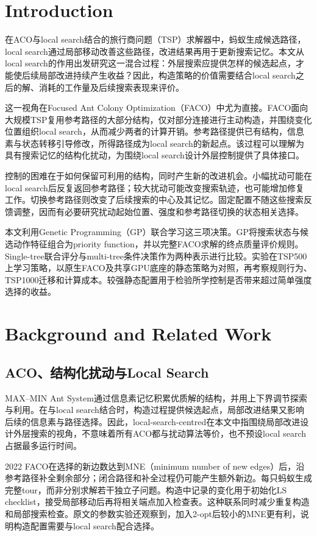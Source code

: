 \section{Introduction}
在ACO与local search结合的旅行商问题（TSP）求解器中，蚂蚁生成候选路径，local search通过局部移动改善这些路径，改进结果再用于更新搜索记忆\cite{stuetzle2000,skinderowicz2022}。本文从local search的作用出发研究这一混合过程：外层搜索应提供怎样的候选起点，才能使后续局部改进持续产生收益？因此，构造策略的价值需要结合local search之后的解、消耗的工作量及后续搜索表现来评价。

这一视角在Focused Ant Colony Optimization（FACO）中尤为直接。FACO面向大规模TSP复用参考路径的大部分结构，仅对部分连接进行主动构造，并围绕变化位置组织local search，从而减少两者的计算开销\cite{skinderowicz2022}。参考路径提供已有结构，信息素与状态转移引导修改，所得路径成为local search的新起点。该过程可以理解为具有搜索记忆的结构化扰动，为围绕local search设计外层控制提供了具体接口。

控制的困难在于如何保留可利用的结构，同时产生新的改进机会。小幅扰动可能在local search后反复返回参考路径；较大扰动可能改变搜索轨迹，也可能增加修复工作。切换参考路径则改变了后续搜索的中心及其记忆。固定配置不随这些搜索反馈调整，因而有必要研究扰动起始位置、强度和参考路径切换的状态相关选择。

本文利用Genetic Programming（GP）联合学习这三项决策。GP将搜索状态与候选动作特征组合为priority function，并以完整FACO求解的终点质量评价规则。Single-tree联合评分与multi-tree条件决策作为两种表示进行比较。实验在TSP500上学习策略，以原生FACO及共享GPU底座的静态策略为对照，再考察规则行为、TSP1000迁移和计算成本。较强静态配置用于检验所学控制是否带来超过简单强度选择的收益。

\section{Background and Related Work}
\subsection{ACO、结构化扰动与Local Search}
MAX--MIN Ant System通过信息素记忆积累优质解的结构，并用上下界调节探索与利用\cite{stuetzle2000}。在与local search结合时，构造过程提供候选起点，局部改进结果又影响后续的信息素与路径选择。因此，local-search-centred在本文中指围绕局部改进设计外层搜索的视角，不意味着所有ACO都与扰动算法等价，也不预设local search占据最多运行时间。

2022 FACO在选择的新边数达到MNE（minimum number of new edges）后，沿参考路径补全剩余部分；闭合路径和补全过程仍可能产生额外新边。每只蚂蚁生成完整tour，而非分别求解若干独立子问题。构造中记录的变化用于初始化LS checklist，接受局部移动后再将相关端点加入检查表\cite{skinderowicz2022}。这种联系同时减少重复构造和局部搜索检查。原文的参数实验还观察到，加入2-opt后较小的MNE更有利，说明构造配置需要与local search配合选择。

